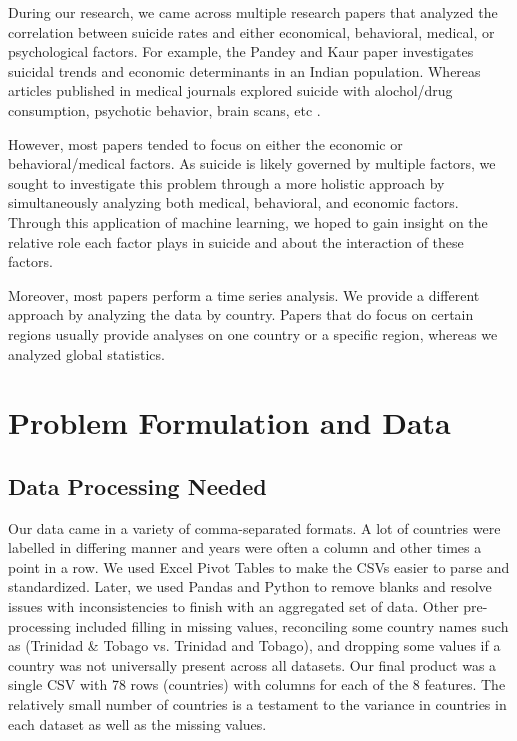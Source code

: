 \documentclass{article}
\begin{document}
\begin{multicols}{2}
During our research, we came across multiple research papers that analyzed the correlation between suicide rates and either economical, behavioral, medical, or psychological factors. For example, the Pandey and Kaur paper investigates suicidal trends and economic determinants in an Indian population. Whereas articles published in medical journals explored suicide with alochol/drug consumption, psychotic behavior, brain scans, etc . 

However, most papers tended to focus on either the economic or behavioral/medical factors. As suicide is likely governed by multiple factors, we sought to investigate this problem through a more holistic approach by simultaneously analyzing both medical, behavioral, and economic factors. Through this application of machine learning, we hoped to gain insight on the relative role each factor plays in suicide and about the interaction of these factors. 

Moreover, most papers perform a time series analysis. We provide a different approach by analyzing the data by country. Papers that do focus on certain regions usually provide analyses on one country or a specific region, whereas we analyzed global statistics. 
\section{Problem Formulation and Data} 
\subsection{Data Processing Needed} Our data came in a variety of comma-separated formats. A lot of countries were labelled in differing manner and years were often a column and other times a point in a row. We used Excel Pivot Tables to make the CSVs easier to parse and standardized. Later, we used Pandas and Python to remove blanks and resolve issues with inconsistencies to finish with an aggregated set of data. Other pre-processing included filling in missing values, reconciling some country names such as (Trinidad \& Tobago vs. Trinidad and Tobago), and dropping some values if a country was not universally present across all datasets. Our final product was a single CSV with 78 rows (countries) with columns for each of the 8 features. The relatively small number of countries is a testament to the variance in countries in each dataset as well as the missing values.

\end{multicols}
\end{document}
